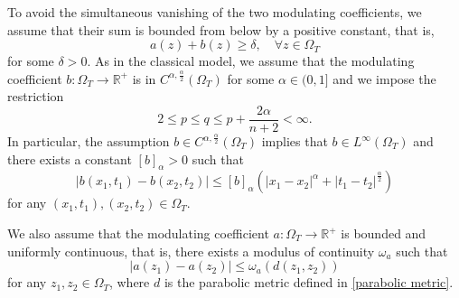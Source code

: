 \documentclass[11pt,oneside, english,reqno,twoside a4paper]{amsart}
\theoremstyle{definition}
\numberwithin{theorem}{section}
\numberwithin{equation}{section}
\begin{document}
To avoid the simultaneous vanishing of the two modulating coefficients, we assume that their sum is bounded from below by a positive constant, that is, 
\begin{equation}\label{eq:coefficient_sum_condition}
    a(z)+b(z)\geq \delta, \quad \forall z\in \Omega_T
\end{equation}
for some $\delta>0$.
As in the classical model, we assume that the modulating coefficient $b:\Omega_T \to \mathbb{R}^+$ is in $C^{\alpha, \frac{\alpha}{2}}(\Omega_T)$ for some $\alpha \in (0,1]$ and we impose the restriction 
\begin{equation}\label{def_pq}
2\leq p \leq q \leq  p + \frac{2\alpha}{n+2}<\infty.
\end{equation}
In particular, the assumption $b \in C^{\alpha, \frac{\alpha}{2}}(\Omega_T)$ implies that $b \in L^{\infty}(\Omega_T)$ and there exists a constant $[b]_{\alpha}>0$ such that
\begin{equation*}
|b(x_1,t_1)-b(x_2,t_2)|\leq [b]_{\alpha}\left(|x_1-x_2|^{\alpha}+|t_1-t_2|^{\frac{\alpha}{2}}\right) 
\end{equation*}
for any $(x_1,t_1), (x_2,t_2) \in \Omega_T$.

We also assume that the modulating coefficient $a: \Omega_T \to \mathbb{R}^{+}$ is bounded and uniformly continuous, that is, there exists a modulus of continuity $\omega_a$ such that
\begin{equation}   \label{eq:assumption of a}
    |a(z_1)-a(z_2)|\leq \omega_a(d(z_1,z_2))
\end{equation}
for any $z_1, z_2 \in \Omega_T$, where $d$ is the parabolic metric defined in \cref{parabolic metric}.


\vspace{0.1cm}
\end{document}
